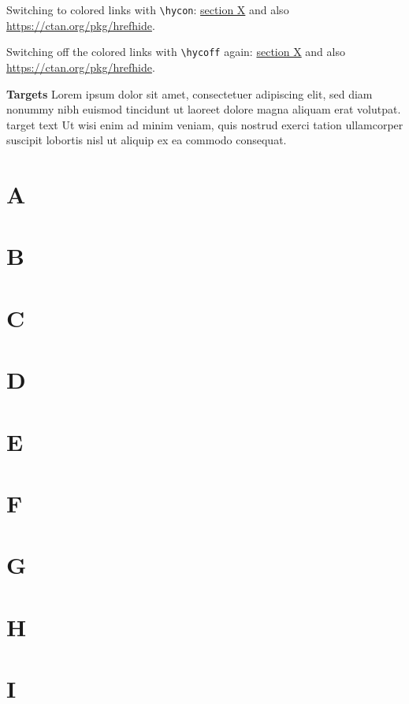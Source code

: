 \documentclass[british]{article}[2024/06/29]%
\begin{document}
Switching to colored links with \verb|\hycon|:\newline
\hycon%
\href{\#RefX}{section X} and also
\href{https://ctan.org/pkg/hrefhide}{https://ctan.org/pkg/hrefhide}.

Switching off the colored links with \verb|\hycoff| again:\newline
\hycoff%
\href{\#RefX}{section X} and also
\href{https://ctan.org/pkg/hrefhide}{https://ctan.org/pkg/hrefhide}.
\pagebreak

{\Large \textbf{Targets}}\newline
Lorem ipsum dolor sit amet, consectetuer adipiscing elit, sed diam
nonummy nibh euismod tincidunt ut laoreet dolore magna aliquam erat
volutpat. \hypertarget{target}{target text} Ut wisi enim ad minim
veniam, quis nostrud exerci tation ullamcorper suscipit lobortis
nisl ut aliquip ex ea commodo consequat.

\section[A]{\hypertarget{RefA}{A}} \lipsum[1]
\section[B]{\hypertarget{RefB}{B}} \lipsum[1]
\section[C]{\hypertarget{RefC}{C}} \lipsum[1]
\section[D]{\hypertarget{RefD}{D}} \lipsum[1]
\section[E]{\hypertarget{RefE}{E}} \lipsum[1]
\section[F]{\hypertarget{RefF}{F}} \lipsum[1]
\section[G]{\hypertarget{RefG}{G}} \lipsum[1]
\section[H]{\hypertarget{RefH}{H}} \lipsum[1]
\section[I]{\hypertarget{RefI}{I}} \lipsum[1]
\end{document}
